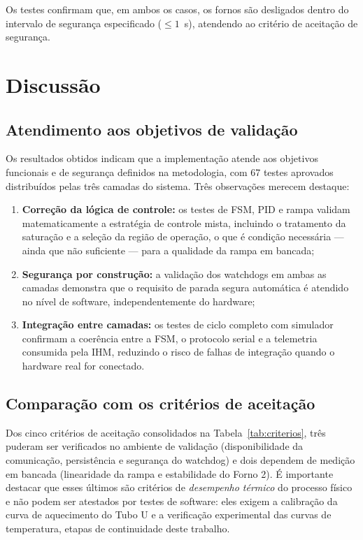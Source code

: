 Os testes confirmam que, em ambos os casos, os fornos s\~ao desligados dentro do
intervalo de seguran\c{c}a especificado ($\le 1$~s), atendendo ao crit\'erio de
aceita\c{c}\~ao de seguran\c{c}a.

\section{Discuss\~ao}

\subsection{Atendimento aos objetivos de valida\c{c}\~ao}

Os resultados obtidos indicam que a implementa\c{c}\~ao atende aos objetivos
funcionais e de seguran\c{c}a definidos na metodologia, com 67 testes aprovados
distribu\'idos pelas tr\^es camadas do sistema. Tr\^es observa\c{c}\~oes merecem
destaque:

\begin{enumerate}[label=\arabic*)]
  \item \textbf{Corre\c{c}\~ao da l\'ogica de controle:} os testes de FSM, PID e
  rampa validam matematicamente a estrat\'egia de controle mista, incluindo o
  tratamento da satura\c{c}\~ao e a sele\c{c}\~ao da regi\~ao de opera\c{c}\~ao,
  o que \'e condi\c{c}\~ao necess\'aria --- ainda que n\~ao suficiente --- para a
  qualidade da rampa em bancada;
  \item \textbf{Seguran\c{c}a por constru\c{c}\~ao:} a valida\c{c}\~ao dos
  watchdogs em ambas as camadas demonstra que o requisito de parada segura
  autom\'atica \'e atendido no n\'ivel de software, independentemente do
  hardware;
  \item \textbf{Integra\c{c}\~ao entre camadas:} os testes de ciclo completo com
  simulador confirmam a coer\^encia entre a FSM, o protocolo serial e a
  telemetria consumida pela IHM, reduzindo o risco de falhas de integra\c{c}\~ao
  quando o hardware real for conectado.
\end{enumerate}

\subsection{Compara\c{c}\~ao com os crit\'erios de aceita\c{c}\~ao}

Dos cinco crit\'erios de aceita\c{c}\~ao consolidados na
Tabela~\ref{tab:criterios}, tr\^es puderam ser verificados no ambiente de
valida\c{c}\~ao (disponibilidade da comunica\c{c}\~ao, persist\^encia e
seguran\c{c}a do watchdog) e dois dependem de medi\c{c}\~ao em bancada
(linearidade da rampa e estabilidade do Forno 2). \'E importante destacar que
esses \'ultimos s\~ao crit\'erios de \emph{desempenho t\'ermico} do processo
f\'isico e n\~ao podem ser atestados por testes de software: eles exigem a
calibra\c{c}\~ao da curva de aquecimento do Tubo U e a verifica\c{c}\~ao
experimental das curvas de temperatura, etapas de continuidade deste trabalho.

